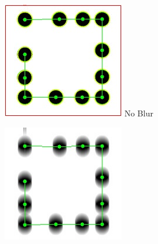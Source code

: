 \documentclass[runningheads]{llncs}
\begin{document}
\begin{figure}
\begin{subfigure}[b]{0.3\textwidth}
  \centering
  \includegraphics[width=\linewidth]{detect_noblur.jpg}
  No Blur  
 \end{subfigure}
 \begin{subfigure}[b]{0.3\textwidth}
  \centering
  \includegraphics[width=\linewidth]{detect_blur15.jpg}

\end{subfigure}
\end{figure}
\end{document}
